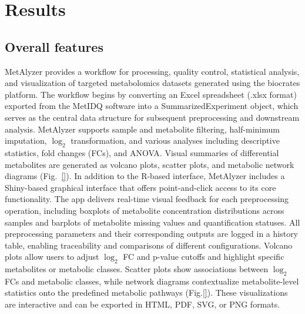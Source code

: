 \documentclass[12pt, a4paper]{article}
\begin{document}

\section*{\large Results}
\subsection*{\normalsize Overall features}
MetAlyzer provides a workflow for processing, quality control, statistical analysis, and visualization of targeted metabolomics datasets generated using the biocrates platform. The workflow begins by converting an Excel spreadsheet (.xlsx format) exported from the MetIDQ software into a SummarizedExperiment object, which serves as the central data structure for subsequent preprocessing and downstream analysis. MetAlyzer supports sample and metabolite filtering, half-minimum imputation, $\log_2$ transformation, and various analyses including descriptive statistics, fold changes (FCs), and ANOVA. Visual summaries of differential metabolites are generated as volcano plots, scatter plots, and metabolic network diagrams (Fig.~\ref{}). In addition to the R-based interface, MetAlyzer includes a Shiny-based graphical interface\cite{Chang2024} that offers point-and-click access to its core functionality. The app delivers real-time visual feedback for each preprocessing operation, including boxplots of metabolite concentration distributions across samples and barplots of metabolite missing values and quantification statuses. All preprocessing parameters and their corresponding outputs are logged in a history table, enabling traceability and comparisons of different configurations. Volcano plots allow users to adjust $\log_2$ FC and p-value cutoffs and highlight specific metabolites or metabolic classes. Scatter plots show associations between $\log_2$ FCs and metabolic classes, while network diagrams contextualize metabolite-level statistics onto the predefined metabolic pathways (Fig.\ref{}). These visualizations are interactive and can be exported in HTML, PDF, SVG, or PNG formats.
\end{document}

